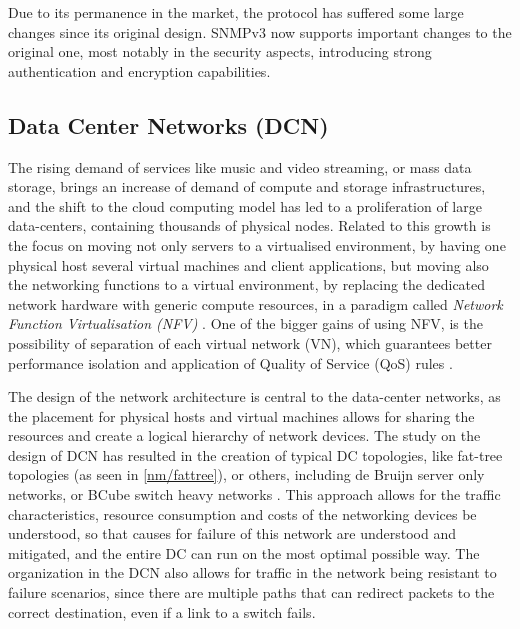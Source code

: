 \par Due to its permanence in the market, the protocol has suffered some large changes since its original design. SNMPv3 now supports important changes to the original one, most notably in the security aspects, introducing strong
authentication and encryption capabilities.

\subsection {Data Center Networks (DCN)}

\par The rising demand of services like music and video streaming, or mass data storage, brings an increase of demand of compute and storage infrastructures, and the shift to the cloud computing model has led to a
proliferation of large data-centers, containing thousands of physical nodes. Related to this growth is the focus on moving not only servers to a virtualised environment, by having one physical host several virtual machines and
client applications, but moving also the networking functions to a virtual environment, by replacing the dedicated network hardware with generic compute resources, in a paradigm called \textit{Network Function Virtualisation (NFV)} 
\cite {CITE - OPENSDWN}. One of the bigger gains of using NFV, is the possibility of separation of each virtual network (VN), which guarantees better performance isolation and application of Quality of Service (QoS) rules
\cite {CITE - Data center virtualisation a survey}. 
\par The design of the network architecture is central to the data-center networks, as the placement for physical hosts and virtual machines allows for sharing the resources and create a logical hierarchy of network devices. The 
study on the design of DCN has resulted in the creation of typical DC topologies, like fat-tree topologies (as seen in \ref {nm/fattree}), or others, including de Bruijn server only networks, or BCube switch heavy networks 
\cite{ popa_cost_2010 }. This approach allows for the traffic characteristics, resource consumption and costs of the networking devices be understood, so that causes for failure of this network are understood and mitigated, 
and the entire DC can run on the most optimal possible way. The organization in the DCN also allows for traffic in the network being resistant to failure scenarios, since there are multiple paths that can redirect packets 
to the correct destination, even if a link to a switch fails.

